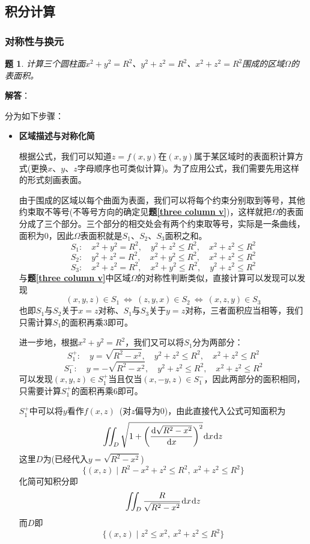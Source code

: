 \documentclass[a4paper,UTF8,fontset=windows,AutoFakeBold]{ctexart}
\newcommand*{\dr}{\hspace{0.07em}\mathrm{d}}
\theoremstyle{ex}
\newtheorem{exercise}{题}
\newcommand{\exref}[1]{\textbf{题\;\ref{#1}\;}}
\newcommand{\sol}[1]{{\vspace{5pt}\kaishu\noindent\textbf{解答}：\vspace{-3pt}
\begin{compactitem}
    \item[] #1
\end{compactitem}
}}
\begin{document}
\subsection{积分计算}
\subsubsection{对称性与换元}
\begin{framed}
\begin{exercise}\label{three column s}
    计算三个圆柱面$x^2+y^2=R^2$、$y^2+z^2=R^2$、$x^2+z^2=R^2$围成的区域$\Omega$的表面积。
\end{exercise}
\sol{
    分为如下步骤：
    \begin{itemize}
        \item \textbf{区域描述与对称化简}
        
        根据公式，我们可以知道$z=f(x,y)$在$(x,y)$属于某区域时的表面积计算方式(更换$x$、$y$、$z$字母顺序也可类似计算)。为了应用公式，我们需要先用这样的形式刻画表面。

        由于围成的区域以每个曲面为表面，我们可以将每个约束分别取到等号，其他约束取不等号(不等号方向的确定见\exref{three column v})，这样就把$\Omega$的表面分成了三个部分。三个部分的相交处会有两个约束取等号，实际是一条曲线，面积为0，因此$\Omega$表面积就是$S_1$、$S_2$、$S_3$面积之和。
        $$S_1:\quad x^2+y^2=R^2,\quad y^2+z^2\le R^2,\quad x^2+z^2\le R^2$$
        $$S_2:\quad y^2+z^2=R^2,\quad x^2+y^2\le R^2,\quad x^2+z^2\le R^2$$
        $$S_3:\quad x^2+z^2=R^2,\quad x^2+y^2\le R^2,\quad y^2+z^2\le R^2$$
        与\exref{three column v}中区域$\Omega$的对称性判断类似，直接计算可以发现可以发现
        $$(x,y,z)\in S_1\ \Longleftrightarrow\ (z,y,x)\in S_2\ \Longleftrightarrow\ (x,z,y)\in S_3$$
        也即$S_1$与$S_2$关于$x=z$对称、$S_1$与$S_3$关于$y=z$对称，三者面积应当相等，我们只需计算$S_1$的面积再乘3即可。

        进一步地，根据$x^2+y^2=R^2$，我们又可以将$S_1$分为两部分：
        $$S_1^+:\quad y=\sqrt{R^2-x^2},\quad y^2+z^2\le R^2,\quad x^2+z^2\le R^2$$
        $$S_1^-:\quad y=-\sqrt{R^2-x^2},\quad y^2+z^2\le R^2,\quad x^2+z^2\le R^2$$
        可以发现$(x,y,z)\in S_1^+$当且仅当$(x,-y,z)\in S_1^-$，因此两部分的面积相同，只需要计算$S_1^+$的面积再乘6即可。

        $S_1^+$中可以将$y$看作$f(x,z)$\ (对$z$偏导为0)，由此直接代入公式可知面积为
        $$\iint_D\sqrt{1+\bigg(\frac{\dr\sqrt{R^2-x^2}}{\dr x}\bigg)^2}\dr x\dr z$$
        这里$D$为(已经代入$y=\sqrt{R^2-x^2}$)
        $$\{(x,z)\mid R^2-x^2+z^2\le R^2,\ x^2+z^2\le R^2\}$$
        化简可知积分即
        $$\iint_D\frac{R}{\sqrt{R^2-x^2}}\dr x\dr z$$
        而$D$即
        $$\{(x,z)\mid z^2\le x^2,\ x^2+z^2\le R^2\}$$


\end{itemize}}
\end{framed}
\end{document}
